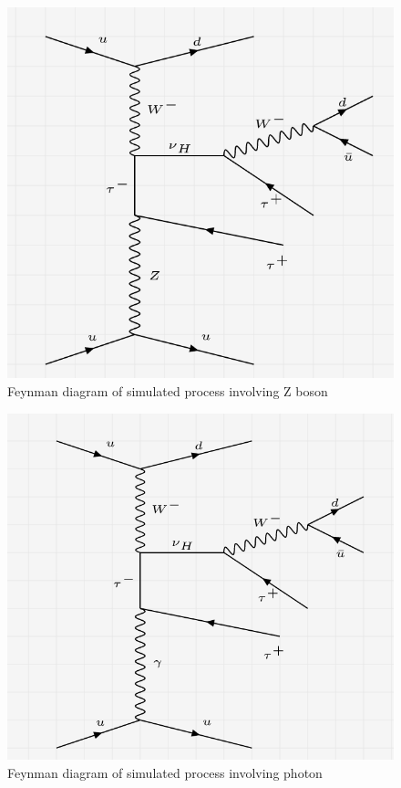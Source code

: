 \documentclass[12pt]{article}
\begin{document}
\begin{figure}[H]
\centering
\includegraphics[scale = 0.45]{Figures/Feynman_hnZ}
\caption{Feynman diagram of simulated process involving Z boson}
\label{fig: hnZ}
\end{figure}

\begin{figure}[H]
\centering
\includegraphics[scale = 0.45]{Figures/Feynman_hnGamma}
\caption{Feynman diagram of simulated process involving photon}
\label{fig: hnGamma}
\end{figure}
\end{document}
